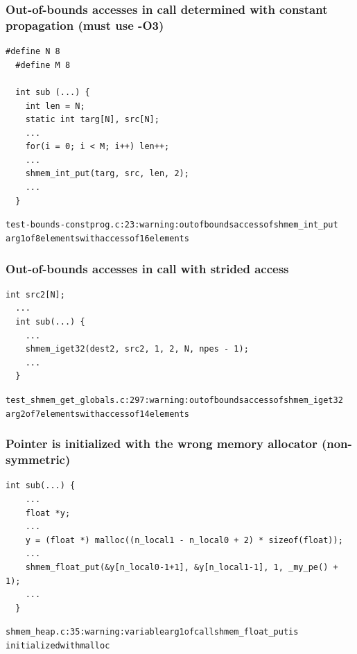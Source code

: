 \begin{minipage}{\linewidth}
\subsubsection{Out-of-bounds accesses in \openshmem call determined with constant propagation (must use -O3)}

\begin{lstlisting}[language=OSH+C]
  #define N 8
  #define M 8

  int sub (...) {
    int len = N;
    static int targ[N], src[N];
    ...
    for(i = 0; i < M; i++) len++;
    ...
    shmem_int_put(targ, src, len, 2);
    ...
  }     
\end{lstlisting}
\begin{alltt}
  test-bounds-constprog.c:23: warning: out of bounds access of shmem_int_put
  arg1 of 8 elements with access of 16 elements
\end{alltt}
\end{minipage}

\begin{minipage}{\linewidth}
\subsubsection{Out-of-bounds accesses in \openshmem call with strided access}

\begin{lstlisting}[language=OSH+C]
  int src2[N];
  ...
  int sub(...) {
    ...
    shmem_iget32(dest2, src2, 1, 2, N, npes - 1);
    ...
  }
\end{lstlisting}
\begin{alltt}
  test_shmem_get_globals.c:297: warning: out of bounds access of shmem_iget32
  arg2 of 7 elements with access of 14 elements
\end{alltt}
\end{minipage}

\begin{minipage}{\linewidth}
\subsubsection{Pointer is initialized with the wrong memory allocator (non-symmetric)}

\begin{lstlisting}[language=OSH+C]
  int sub(...) {
    ...
    float *y;
    ...
    y = (float *) malloc((n_local1 - n_local0 + 2) * sizeof(float));
    ...
    shmem_float_put(&y[n_local0-1+1], &y[n_local1-1], 1, _my_pe() + 1);
    ...
  } 
\end{lstlisting}
\begin{alltt}
  shmem_heap.c:35: warning: variable arg1 of call shmem_float_put is
  initialized with malloc
\end{alltt}
\end{minipage}

